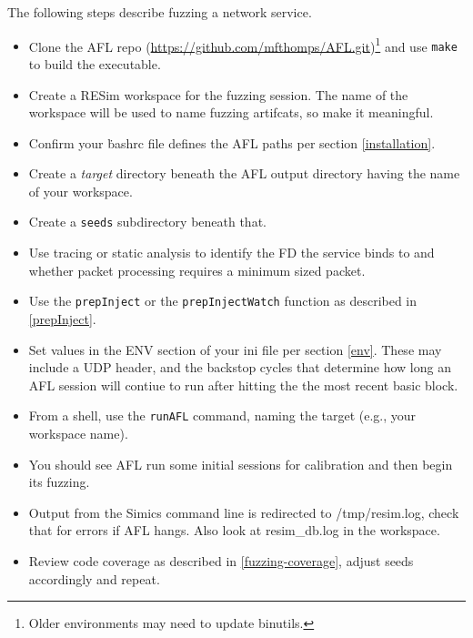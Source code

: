 \documentclass[titlepage]{article}
\begin{document}
The following steps describe fuzzing a network service.
\begin{itemize}
\item Clone the AFL repo (\url{https://github.com/mfthomps/AFL.git})\footnote{Older environments may need to update binutils.} and use {\tt make} to build the executable.
\item Create a RESim workspace for the fuzzing session.  The name of the workspace will be used
to name fuzzing artifcats, so make it meaningful.
\item Confirm your {\.bashrc} file defines the AFL paths per section \ref{installation}.
\item Create a \textit{target} directory beneath the AFL output directory having the name of your workspace.
\item Create a {\tt seeds} subdirectory beneath that. 
\item Use tracing or static analysis to identify the FD the service binds to and whether packet processing requires a minimum sized packet.
\item Use the {\tt prepInject} or the {\tt prepInjectWatch} function as described in \ref{prepInject}.
\item Set values in the ENV section of your ini file per section \ref{env}.  These may include a UDP header, and the 
backstop cycles that determine how long an AFL session will contiue to run after hitting the the most recent basic block. 
\item From a shell, use the {\tt runAFL} command, naming the target (e.g., your workspace name).
\item You should see AFL run some initial sessions for calibration and then begin its fuzzing.
\item Output from the Simics command line is redirected to /tmp/resim.log, check that for errors if AFL hangs.  Also look at resim\_db.log
in the workspace.
\item Review code coverage as described in \ref{fuzzing-coverage}, adjust seeds accordingly and repeat.
\end{itemize}
\end{document}
